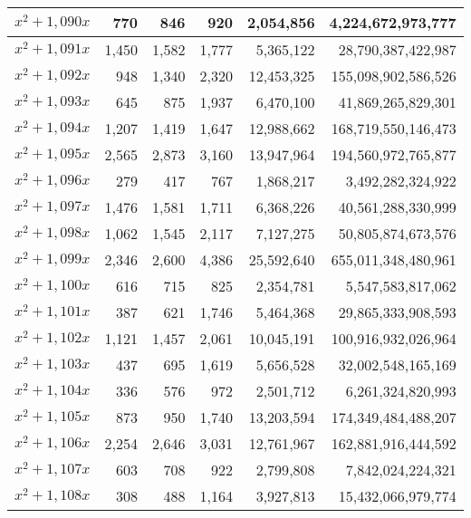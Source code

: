 \documentclass[a4paper]{amsproc}
\theoremstyle{plain}
\begin{document}
\begin{longtable}{ | l | r | r | r | r | r | }
$x^2 + 1{,}090x$ & 770 & 846 & 920 & 2{,}054{,}856 & 4{,}224{,}672{,}973{,}777 \\ \hline
$x^2 + 1{,}091x$ & 1{,}450 & 1{,}582 & 1{,}777 & 5{,}365{,}122 & 28{,}790{,}387{,}422{,}987 \\ \hline
$x^2 + 1{,}092x$ & 948 & 1{,}340 & 2{,}320 & 12{,}453{,}325 & 155{,}098{,}902{,}586{,}526 \\ \hline
$x^2 + 1{,}093x$ & 645 & 875 & 1{,}937 & 6{,}470{,}100 & 41{,}869{,}265{,}829{,}301 \\ \hline
$x^2 + 1{,}094x$ & 1{,}207 & 1{,}419 & 1{,}647 & 12{,}988{,}662 & 168{,}719{,}550{,}146{,}473 \\ \hline
$x^2 + 1{,}095x$ & 2{,}565 & 2{,}873 & 3{,}160 & 13{,}947{,}964 & 194{,}560{,}972{,}765{,}877 \\ \hline
$x^2 + 1{,}096x$ & 279 & 417 & 767 & 1{,}868{,}217 & 3{,}492{,}282{,}324{,}922 \\ \hline
$x^2 + 1{,}097x$ & 1{,}476 & 1{,}581 & 1{,}711 & 6{,}368{,}226 & 40{,}561{,}288{,}330{,}999 \\ \hline
$x^2 + 1{,}098x$ & 1{,}062 & 1{,}545 & 2{,}117 & 7{,}127{,}275 & 50{,}805{,}874{,}673{,}576 \\ \hline
$x^2 + 1{,}099x$ & 2{,}346 & 2{,}600 & 4{,}386 & 25{,}592{,}640 & 655{,}011{,}348{,}480{,}961 \\ \hline
$x^2 + 1{,}100x$ & 616 & 715 & 825 & 2{,}354{,}781 & 5{,}547{,}583{,}817{,}062 \\ \hline
$x^2 + 1{,}101x$ & 387 & 621 & 1{,}746 & 5{,}464{,}368 & 29{,}865{,}333{,}908{,}593 \\ \hline
$x^2 + 1{,}102x$ & 1{,}121 & 1{,}457 & 2{,}061 & 10{,}045{,}191 & 100{,}916{,}932{,}026{,}964 \\ \hline
$x^2 + 1{,}103x$ & 437 & 695 & 1{,}619 & 5{,}656{,}528 & 32{,}002{,}548{,}165{,}169 \\ \hline
$x^2 + 1{,}104x$ & 336 & 576 & 972 & 2{,}501{,}712 & 6{,}261{,}324{,}820{,}993 \\ \hline
$x^2 + 1{,}105x$ & 873 & 950 & 1{,}740 & 13{,}203{,}594 & 174{,}349{,}484{,}488{,}207 \\ \hline
$x^2 + 1{,}106x$ & 2{,}254 & 2{,}646 & 3{,}031 & 12{,}761{,}967 & 162{,}881{,}916{,}444{,}592 \\ \hline
$x^2 + 1{,}107x$ & 603 & 708 & 922 & 2{,}799{,}808 & 7{,}842{,}024{,}224{,}321 \\ \hline
$x^2 + 1{,}108x$ & 308 & 488 & 1{,}164 & 3{,}927{,}813 & 15{,}432{,}066{,}979{,}774 \\ \hline

\end{longtable}
\end{document}
